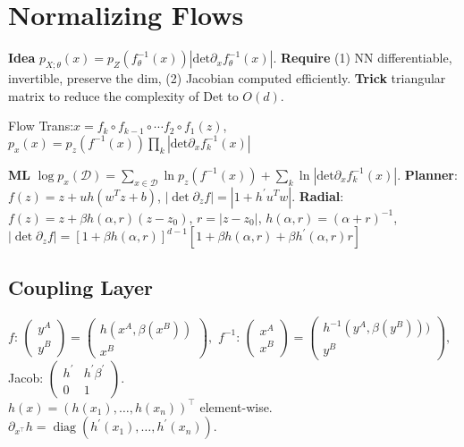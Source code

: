 \section{Normalizing Flows}
\textbf{Idea} \( p_{X;\theta}(x)=p_{Z}(f_{\theta}^{-1}(x))|\text{det}\partial_{x} f_{\theta}^{-1}(x)|\).
\textbf{Require} (1) NN differentiable, invertible, preserve the dim, (2) Jacobian computed efficiently.
\textbf{Trick} triangular matrix to reduce the complexity of Det to \(O(d)\).

Flow Trans:\({x} = f_{k} \circ f_{k-1} \circ \cdots f_{2} \circ f_{1}(z)\), \(p_{x}(x)=p_{z}(f^{-1}(x)) \prod_{k}|\text{det}\partial_{x} f_{k}^{-1}(x)| \)

\textbf{ML} \(\log p_{x}({\mathcal{D}})=\sum_{x \in \mathcal{D}}\ln p_{z}(f^{-1}({x}))+\sum_{k} \ln|\text{det}\partial_{x} f_{k}^{-1}(x)| \).
\textbf{Planner}: \(f(z)={z}+{u h}({w}^{T} {z}+{b})\), \(|\operatorname{det} \partial_{{z}} f |=|1+h^{\prime} {u}^{T} {w}|\).
\textbf{Radial}: \(f({z})={z}+\beta h(\alpha, r)({z}-{z}_{0})\), \(r=|{z}-{z}_{0}|\), \(h(\alpha, r)=(\alpha+r)^{-1}\), \(|\operatorname{det} \partial_{{z}} f| = [1+\beta h(\alpha, r)]^{d-1}[1+\beta h(\alpha, r)+\beta h^{\prime}(\alpha, r) r]\)

\subsection*{Coupling Layer}
\textsf{$f$\!:\!}
\(\left(\begin{array}{c}
        y^{A} \\
        y^{B}
    \end{array}\right)=\left(\begin{array}{c}
        h(x^{A}, \beta(x^{B})) \\
        x^{B}
    \end{array}\right),\)
\textsf{$f^{-1}$\!:\!} \(\left(\begin{array}{l}
        x^{A} \\
        x^{B}
    \end{array}\right)=\left(\begin{array}{c}
        h^{-1}(y^{A}, \beta(y^{B}))) \\
        y^{B}
    \end{array}\right),\)
Jacob: \(\left(\begin{array}{cc}
        h^{\prime} & h^{\prime} \beta^{\prime} \\
        0          & 1
    \end{array}\right).\)\\
\(h(x) = (h(x_{1}), \ldots, h(x_{n}))^{\top}\) element-wise. \( \partial_{x^{\top}} h=\operatorname{diag}(h^{\prime}(x_{1}), \ldots, h^{\prime}(x_{n}))\).

